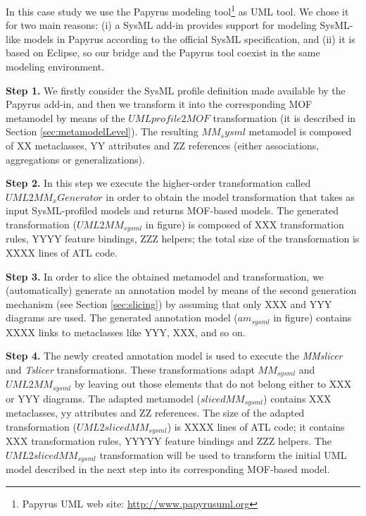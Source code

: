 
In this case study we use the Papyrus modeling tool\footnote{Papyrus UML web site: \small{\url{http://www.papyrusuml.org}}} as UML
tool. We chose it for two main reasons: (i) a SysML add-in provides support for modeling SysML-like models in Papyrus according to
the official SysML specification,
and (ii) it is based on Eclipse, so our bridge and the Papyrus tool coexist in the same modeling environment.

\textbf{Step 1.} We firstly consider the SysML profile definition made available by the Papyrus add-in,
and then we transform it into the corresponding MOF metamodel
by means of the $UMLprofile2MOF$ transformation (it is described in Section \ref{sec:metamodelLevel}). 
The resulting $MM_sysml$ metamodel is composed of XX metaclasses, YY attributes and ZZ references 
(either associations, aggregations or generalizations).

\textbf{Step 2.} In this step we execute the higher-order transformation called $UML2MM_xGenerator$ in order to obtain the
model transformation that takes as input SysML-profiled models and returns MOF-based models. The generated transformation 
($UML2MM_{sysml}$ in figure) is composed of XXX transformation rules, YYYY feature bindings, ZZZ helpers; the total size of the transformation is XXXX lines of ATL code.

\textbf{Step 3.} In order to slice the obtained metamodel and transformation, 
we (automatically) generate an annotation model by means of the second generation mechanism
(see Section \ref{sec:slicing}) by assuming that only XXX and YYY diagrams are used.
The generated annotation model ($am_{sysml}$ in figure) contains XXXX links to metaclasses like YYY, XXX, and so on.

\textbf{Step 4.} The newly created annotation model is used to execute the \textit{MMslicer} and \textit{Tslicer} transformations.
These transformations adapt $MM_{sysml}$ and $UML2MM_{sysml}$ by leaving out those elements that do not belong either to XXX or YYY diagrams. 
The adapted metamodel ($slicedMM_{sysml}$) contains XXX metaclasses, yy attributes and ZZ references. 
The size of the adapted transformation ($UML2slicedMM_{sysml}$) is XXXX lines 
of ATL code; it contains XXX transformation rules, YYYYY feature bindings and ZZZ helpers. 
The $UML2slicedMM_{sysml}$ transformation will be used to transform the initial UML model described in the next step into its 
corresponding MOF-based model.

